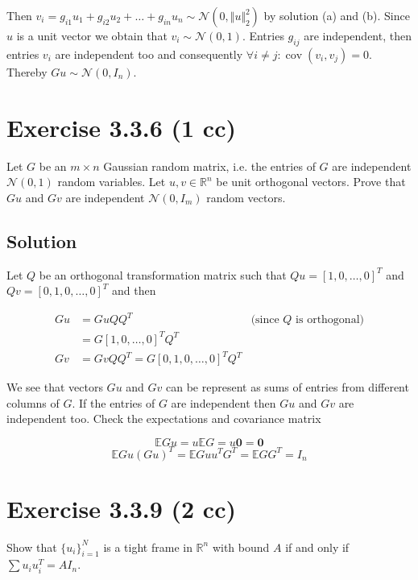 \documentclass{article}
\DeclareMathOperator{\cov}{cov}
\begin{document}
Then $v_i = g_{i1}u_1 + g_{i2}u_2 + \dots + g_{in}u_n \sim \mathcal N (0, \Vert u \Vert^2_2)$ by solution (a) and (b). Since $u$ is a unit vector we obtain that $v_i \sim \mathcal N (0, 1)$. Entries $g_{ij}$ are independent, then entries $v_i$ are independent too and consequently $\forall i \neq j: \cov(v_i, v_j) = 0$. Thereby $Gu \sim \mathcal N (0, I_n)$.

\section{Exercise 3.3.6 (1 cc)}

Let $G$ be an $m\times n$ Gaussian random matrix, i.e. the entries of $G$ are independent $\mathcal N (0, 1)$ random variables. Let $u, v \in \mathbb R^n$ be unit orthogonal vectors. Prove that $Gu$ and $Gv$ are independent $\mathcal N(0,I_m)$ random vectors.

\subsection{Solution}

Let $Q$ be an orthogonal transformation matrix such that $Qu = [1, 0, \dots, 0]^T$ and $Qv = [0, 1, 0, \dots, 0]^T$ and then

\begin{equation*}
    \begin{aligned}
        Gu & = GuQQ^T & \text{(since $Q$ is orthogonal)} \\
        & = G[1, 0, \dots, 0]^TQ^T \\
        Gv & = GvQQ^T = G[0, 1, 0, \dots, 0]^TQ^T
    \end{aligned}
\end{equation*}

We see that vectors $Gu$ and $Gv$ can be represent as sums of entries from different columns of $G$. If the entries of $G$ are independent then $Gu$ and $Gv$ are independent too. Check the expectations and covariance matrix

$$\mathbb E Gu = u \mathbb E G = u \mathbf 0 = \mathbf 0$$
$$\mathbb E Gu(Gu)^T = \mathbb E Guu^TG^T = \mathbb E G G^T = I_n$$

\section{Exercise 3.3.9 (2 cc)}

Show that $\{u_i\}^N_{i=1}$ is a tight frame in $\mathbb R^n$ with bound $A$ if and only if $\sum u_iu_i^T = AI_n$.
\end{document}
